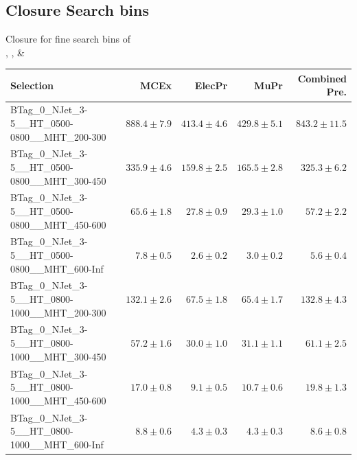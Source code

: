 \documentclass{beamer}
\begin{document}
\subsection{Closure Search bins}
\begin{frame}
 \begin{center}
    {\Large Closure for fine search bins of\\ \HT, \MHT, \NJets \& \BTags}
  \end{center}
\end{frame}
\begin{frame}
\tiny
\begin{tabular}{lrrrr}
\toprule

                                                Selection  &                     MCEx  &           ElecPr  &             MuPr  &          Combined Pre.  \\ 
\midrule
     BTag\_0\_NJet\_3-5\_\_HT\_0500-0800\_\_MHT\_200-300 &             $888.4\pm7.9$&             $413.4\pm4.6$&             $429.8\pm5.1$&                $843.2\pm11.5$ \\ 
      BTag\_0\_NJet\_3-5\_\_HT\_0500-0800\_\_MHT\_300-450 &             $335.9\pm4.6$&             $159.8\pm2.5$&             $165.5\pm2.8$&                 $325.3\pm6.2$ \\ 
      BTag\_0\_NJet\_3-5\_\_HT\_0500-0800\_\_MHT\_450-600 &              $65.6\pm1.8$&              $27.8\pm0.9$&              $29.3\pm1.0$&                  $57.2\pm2.2$ \\ 
      BTag\_0\_NJet\_3-5\_\_HT\_0500-0800\_\_MHT\_600-Inf &               $7.8\pm0.5$&               $2.6\pm0.2$&               $3.0\pm0.2$&                   $5.6\pm0.4$ \\ 
      BTag\_0\_NJet\_3-5\_\_HT\_0800-1000\_\_MHT\_200-300 &             $132.1\pm2.6$&              $67.5\pm1.8$&              $65.4\pm1.7$&                 $132.8\pm4.3$ \\ 
      BTag\_0\_NJet\_3-5\_\_HT\_0800-1000\_\_MHT\_300-450 &              $57.2\pm1.6$&              $30.0\pm1.0$&              $31.1\pm1.1$&                  $61.1\pm2.5$ \\ 
      BTag\_0\_NJet\_3-5\_\_HT\_0800-1000\_\_MHT\_450-600 &              $17.0\pm0.8$&               $9.1\pm0.5$&              $10.7\pm0.6$&                  $19.8\pm1.3$ \\ 
      BTag\_0\_NJet\_3-5\_\_HT\_0800-1000\_\_MHT\_600-Inf &               $8.8\pm0.6$&               $4.3\pm0.3$&               $4.3\pm0.3$&                   $8.6\pm0.8$ \\ 

\end{tabular}
\end{frame}
\end{document}
